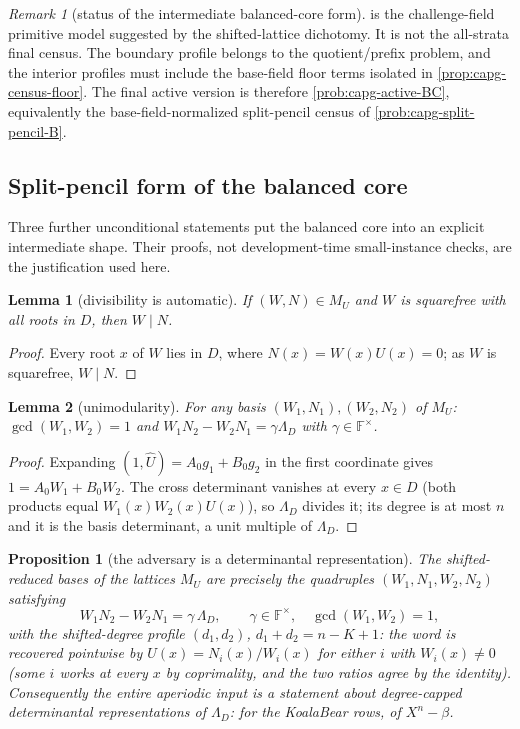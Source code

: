 \documentclass[11pt]{article}
\newtheorem{lemma}[lemma]{Lemma}
\newtheorem{proposition}[proposition]{Proposition}
\theoremstyle{definition}
\theoremstyle{remark}
\newtheorem{remark}[remark]{Remark}
\newcommand{\F}{\mathbb{F}}
\begin{document}
\begin{remark}[status of the intermediate balanced-core form]
\label{rem:capfp-balanced-active-reading}
 is the challenge-field primitive model suggested by
the shifted-lattice dichotomy.  It is not the all-strata final census.  The
boundary profile belongs to the quotient/prefix problem, and the interior
profiles must include the base-field floor terms isolated in
\cref{prop:capg-census-floor}.  The final active version is therefore
\cref{prob:capg-active-BC}, equivalently the base-field-normalized
split-pencil census of \cref{prob:capg-split-pencil-B}.
\end{remark}

\subsection{Split-pencil form of the balanced core}

Three further unconditional statements put the balanced core into an explicit intermediate shape.  Their proofs, not development-time small-instance checks, are the justification used here.

\begin{lemma}[divisibility is automatic]\label{lem:capfp-autodiv}
If $(W,N)\in M_U$ and $W$ is squarefree with all roots in $D$, then $W\mid N$.
\end{lemma}

\begin{proof}
Every root $x$ of $W$ lies in $D$, where $N(x)=W(x)U(x)=0$; as $W$ is squarefree, $W\mid N$.
\end{proof}

\begin{lemma}[unimodularity]\label{lem:capfp-unimodular}
For any basis $(W_1,N_1),(W_2,N_2)$ of $M_U$: $\gcd(W_1,W_2)=1$ and $W_1N_2-W_2N_1=\gamma\Lambda_D$ with $\gamma\in\F^\times$.
\end{lemma}

\begin{proof}
Expanding $(1,\widehat U)=A_0g_1+B_0g_2$ in the first coordinate gives $1=A_0W_1+B_0W_2$.  The cross determinant vanishes at every $x\in D$ \textup(both products equal $W_1(x)W_2(x)U(x)$\textup), so $\Lambda_D$ divides it; its degree is at most $n$ and it is the basis determinant, a unit multiple of $\Lambda_D$.
\end{proof}

\begin{proposition}[the adversary is a determinantal representation]\label{prop:capfp-detrep}
The shifted-reduced bases of the lattices $M_U$ are precisely the quadruples
$(W_1,N_1,W_2,N_2)$ satisfying
\[
        W_1N_2-W_2N_1=\gamma\,\Lambda_D,\qquad\gamma\in\F^\times,\quad\gcd(W_1,W_2)=1,
\]
with the shifted-degree profile $(d_1,d_2)$, $d_1+d_2=n-K+1$: the word is recovered pointwise by $U(x)=N_i(x)/W_i(x)$ for either $i$ with $W_i(x)\ne0$ \textup(some $i$ works at every $x$ by coprimality, and the two ratios agree by the identity\textup).  Consequently the entire aperiodic input is a statement about degree-capped determinantal representations of $\Lambda_D$: for the KoalaBear rows, of $X^n-\beta$.
\end{proposition}
\end{document}
